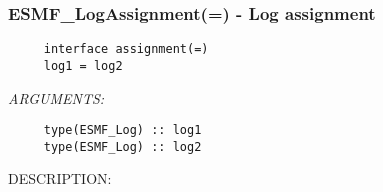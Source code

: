  
\setlength{\oldparskip}{\parskip}
\setlength{\parskip}{1.5ex}
\setlength{\oldparindent}{\parindent}
\setlength{\parindent}{0pt}
\setlength{\oldbaselineskip}{\baselineskip}
\setlength{\baselineskip}{11pt}
 
\def\bv{\begin{verbatim}}
\def\ev{\end{verbatim}}
\def\be{\begin{equation}}
\def\ee{\end{equation}}
\def\bea{\begin{eqnarray}}
\def\eea{\end{eqnarray}}
\def\bi{\begin{itemize}}
\def\ei{\end{itemize}}
\def\bn{\begin{enumerate}}
\def\en{\end{enumerate}}
\def\bd{\begin{description}}
\def\ed{\end{description}}
\def\({\left (}
\def\){\right )}
\def\[{\left [}
\def\]{\right ]}
\def\<{\left  \langle}
\def\>{\right \rangle}
\def\cI{{\cal I}}
\def\diag{\mathop{\rm diag}}
\def\tr{\mathop{\rm tr}}


 
\subsubsection [ESMF\_LogAssignment(=)] {ESMF\_LogAssignment(=) - Log assignment}


  
\begin{verbatim}     interface assignment(=)
     log1 = log2\end{verbatim}{\em ARGUMENTS:}
\begin{verbatim}     type(ESMF_Log) :: log1
     type(ESMF_Log) :: log2\end{verbatim}
{\sf DESCRIPTION:\\ }


